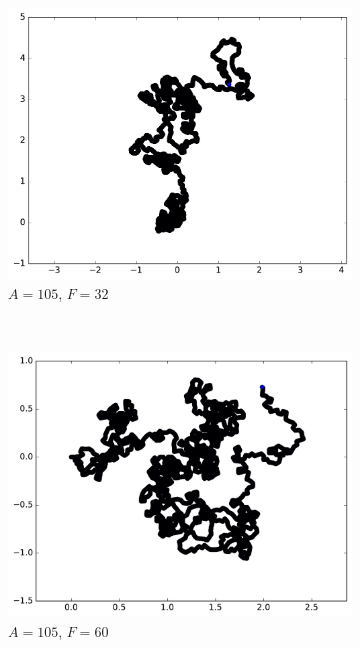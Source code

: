 \begin{appendices}
\begin{figure}[htbp]
\begin{subfigure}[t]{\subImgWmo}
			\centering
			\includegraphics[width=\textwidth]{figures/ch3/synTraj_219_105_32}
			\caption[$A = 105$, $F=32$]{$A = 105$, $F=32$}
			\label{fig:synTraj_219_105_32}
		\end{subfigure}
		~
		\begin{subfigure}[t]{\subImgWmo}
			\centering
			\includegraphics[width=\textwidth]{figures/ch3/synTraj_219_105_60}
			\caption[$A = 105$, $F=60$]{$A = 105$, $F=60$}
			\label{fig:synTraj_219_105_60}
		\end{subfigure}
		~
		\begin{subfigure}[t]{\subImgWmo}
			\centering

\end{subfigure}
\end{figure}
\end{appendices}

